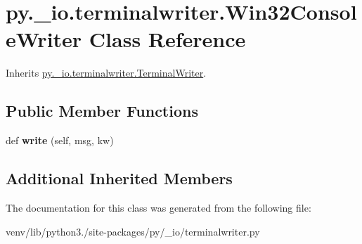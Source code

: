 \hypertarget{classpy_1_1__io_1_1terminalwriter_1_1_win32_console_writer}{}\section{py.\+\_\+io.\+terminalwriter.\+Win32\+Console\+Writer Class Reference}
\label{classpy_1_1__io_1_1terminalwriter_1_1_win32_console_writer}


Inherits \hyperlink{classpy_1_1__io_1_1terminalwriter_1_1_terminal_writer}{py.\+\_\+io.\+terminalwriter.\+Terminal\+Writer}.

\subsection*{Public Member Functions}
\begin{DoxyCompactItemize}
\item 
\mbox{\label{classpy_1_1__io_1_1terminalwriter_1_1_win32_console_writer_af0641bfba095d86187df07244d7e39e4}} 
def {\bfseries write} (self, msg, kw)
\end{DoxyCompactItemize}
\subsection*{Additional Inherited Members}


The documentation for this class was generated from the following file\+:\begin{DoxyCompactItemize}
\item 
venv/lib/python3./site-\/packages/py/\+\_\+io/terminalwriter.\+py\end{DoxyCompactItemize}
